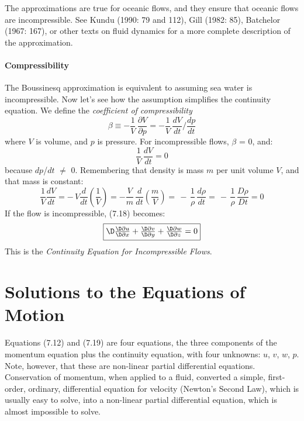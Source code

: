 The approximations are true for oceanic flows, and they ensure that oceanic
flows are incompressible. See Kundu (1990: 79 and 112), Gill (1982: 85),
Batchelor (1967: 167), or other texts on fluid dynamics for a more complete
description of the approximation.

\paragraph{Compressibility}
The Boussinesq approximation is equivalent to
assuming sea water is incompressible. Now let's see how the assumption simplifies the continuity
equation. We define the \textit{coefficient of compressibility}
\begin{displaymath}
\beta \equiv -\frac{1}{V}\,\frac{\partial{V}}{\partial{p}} =
-\frac{1}{V}\,\frac{dV}{dt}\Big/\frac{dp}{dt}
\end{displaymath}
where $V$ is volume, and $p$ is pressure. For incompressible flows, $\beta$ = 0,
and:
\begin{displaymath}
\frac{1}{V}\,\frac{dV}{dt} = 0
\end{displaymath}
because $dp$/$dt$ $\not=$ 0. Remembering that density is mass
$m$ per unit volume $V$, and that mass is constant:
\begin{displaymath}
\frac{1}{V}\frac{dV}{dt} = -\,V\frac{d}{dt}\left(\frac{1}{V}\right) =
- \frac{V}{m}\,\frac{d}{dt}\left(\frac{m}{V}\right)
=\,-\,\frac{1}{\rho}\,\frac{d\rho}{dt} =\,-\,\frac{1}{\rho}\, \frac{D\rho}{Dt} = 0
\end{displaymath}
If the flow is incompressible, (7.18) becomes:
\begin{equation}
\fbox{$ \D
\frac{\D\partial{u}}{\D\partial{x}} + \frac{\D\partial{v}}{\D\partial{y}} + \frac{\D\partial{w}}{\D\partial{z}} = 0 $}
\end{equation}
This is the  \textit{Continuity Equation for
Incompressible Flows}.

\section{Solutions to the Equations of Motion}
Equations (7.12) and (7.19) are four equations, the three components of
the momentum equation plus the continuity equation, with four unknowns: $u$, $v$,
$w$, $p$. Note, however, that these are non-linear partial differential equations.
Conservation of momentum, when applied to a fluid, converted a simple,
first-order, ordinary, differential equation for velocity (Newton's Second Law),
which is usually easy to solve, into a non-linear partial differential equation,
which is almost impossible to solve.

